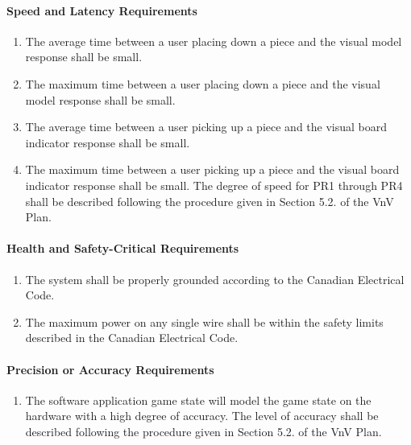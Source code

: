 \documentclass[12pt]{article}
\begin{document}
{\paragraph{Speed and Latency Requirements}
\begin{enumerate}[{PR}1., leftmargin=2\parindent]
    \item The average time between a user placing down a piece and the visual model response shall be small.
    \item The maximum time between a user placing down a piece and the visual model response shall be small.
    \item The average time between a user picking up a piece and the visual board indicator response shall be small.
    \item The maximum time between a user picking up a piece and the visual board indicator response shall be small. 
    The degree of speed for PR1 through PR4 shall be described following the procedure given in Section 5.2.\thevnvSectionNfr{}
    of the VnV Plan.
\end{enumerate}

\paragraph{Health and Safety-Critical Requirements}
\begin{enumerate}[{PR}1., leftmargin=2\parindent, resume]
    \item The system shall be properly grounded according to the Canadian Electrical Code. \cite{CanadianElectricalCode2021}
    \item The maximum power on any single wire shall be within the safety limits described in the Canadian Electrical Code.
\end{enumerate}

\paragraph{Precision or Accuracy Requirements}
\begin{enumerate}[{PR}1., leftmargin=2\parindent, resume]
    \item The software application game state will model the game state on the \progname{} hardware with a high degree of accuracy. 
    The level of accuracy shall be described following the procedure given in Section 5.2.\thevnvSectionNfr{}
    of the VnV Plan.
\end{enumerate}

}
\end{document}
